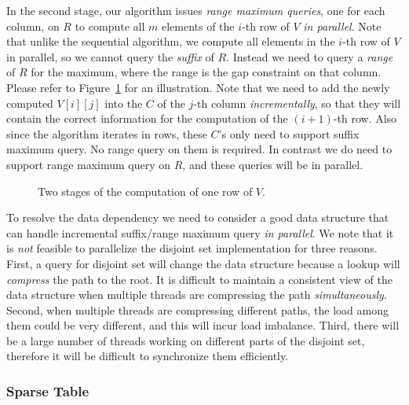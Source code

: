 In the second stage, our algorithm issues {\em range maximum queries},
one for each column, on $R$ to compute all $m$ elements of the $i$-th
row of $V$ {\em in parallel}.  Note that unlike the sequential
algorithm, we compute all elements in the $i$-th row of $V$ in parallel,
so we cannot query the {\em suffix} of $R$.  Instead we need to query a
{\em range} of $R$ for the maximum, where the range is the gap
constraint on that column.  Please refer to
Figure~\ref{fig:fig-VGLCS-dp-rmq} for an illustration.  Note that we
need to add the newly computed $V[i][j]$ into the $C$ of the $j$-th
column {\em incrementally}, so that they will contain the correct
information for the computation of the $(i+1)$-th row.  Also since the
algorithm iterates in rows, these $C$'s only need to support suffix
maximum query.  No range query on them is required.  In contrast we do
need to support range maximum query on $R$, and these queries will be in
parallel.

\begin{figure}[!thb]
  \centering {} 
  \caption{Two stages of the computation of one row of $V$.}
  \label{fig:fig-VGLCS-dp-rmq}
\end{figure}

To resolve the data dependency we need to consider a good data structure
that can handle incremental suffix/range maximum query {\em in
parallel}.  We note that it is {\em not} feasible to parallelize the
disjoint set implementation for three reasons.  First, a query for
disjoint set will change the data structure because a lookup will {\em
compress} the path to the root.  It is difficult to maintain a
consistent view of the data structure when multiple threads are
compressing the path {\em simultaneously}.  Second, when multiple
threads are compressing different paths, the load among them could be
very different, and this will incur load imbalance.  Third, there will
be a large number of threads working on different parts of the disjoint
set, therefore it will be difficult to synchronize them efficiently.

\subsubsection{Sparse Table} \label{sec:sparse-table}

